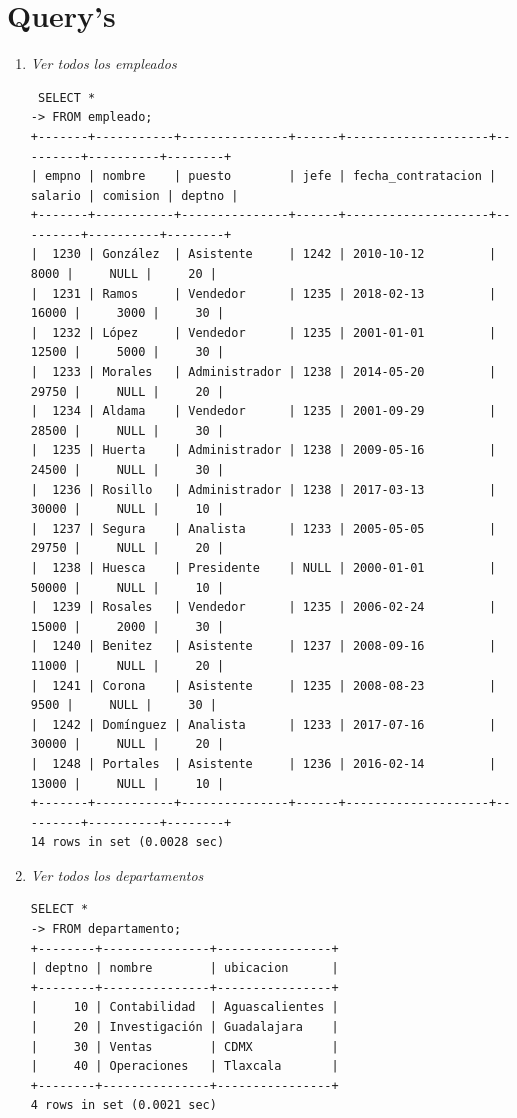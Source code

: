 \documentclass[titlepage,a4paper]{article}
\theoremstyle{definition}
\theoremstyle{remark}
\begin{document}
\section{Query's}
\begin{enumerate}
    \item \textit{Ver todos los empleados}
    \begin{lstlisting}
 SELECT *
-> FROM empleado;
+-------+-----------+---------------+------+--------------------+---------+----------+--------+
| empno | nombre    | puesto        | jefe | fecha_contratacion | salario | comision | deptno |
+-------+-----------+---------------+------+--------------------+---------+----------+--------+
|  1230 | González  | Asistente     | 1242 | 2010-10-12         |    8000 |     NULL |     20 |
|  1231 | Ramos     | Vendedor      | 1235 | 2018-02-13         |   16000 |     3000 |     30 |
|  1232 | López     | Vendedor      | 1235 | 2001-01-01         |   12500 |     5000 |     30 |
|  1233 | Morales   | Administrador | 1238 | 2014-05-20         |   29750 |     NULL |     20 |
|  1234 | Aldama    | Vendedor      | 1235 | 2001-09-29         |   28500 |     NULL |     30 |
|  1235 | Huerta    | Administrador | 1238 | 2009-05-16         |   24500 |     NULL |     30 |
|  1236 | Rosillo   | Administrador | 1238 | 2017-03-13         |   30000 |     NULL |     10 |
|  1237 | Segura    | Analista      | 1233 | 2005-05-05         |   29750 |     NULL |     20 |
|  1238 | Huesca    | Presidente    | NULL | 2000-01-01         |   50000 |     NULL |     10 |
|  1239 | Rosales   | Vendedor      | 1235 | 2006-02-24         |   15000 |     2000 |     30 |
|  1240 | Benitez   | Asistente     | 1237 | 2008-09-16         |   11000 |     NULL |     20 |
|  1241 | Corona    | Asistente     | 1235 | 2008-08-23         |    9500 |     NULL |     30 |
|  1242 | Domínguez | Analista      | 1233 | 2017-07-16         |   30000 |     NULL |     20 |
|  1248 | Portales  | Asistente     | 1236 | 2016-02-14         |   13000 |     NULL |     10 |
+-------+-----------+---------------+------+--------------------+---------+----------+--------+
14 rows in set (0.0028 sec)
    \end{lstlisting}


    \item \textit{Ver todos los departamentos}
    \begin{lstlisting}
SELECT *
-> FROM departamento;
+--------+---------------+----------------+
| deptno | nombre        | ubicacion      |
+--------+---------------+----------------+
|     10 | Contabilidad  | Aguascalientes |
|     20 | Investigación | Guadalajara    |
|     30 | Ventas        | CDMX           |
|     40 | Operaciones   | Tlaxcala       |
+--------+---------------+----------------+
4 rows in set (0.0021 sec)
    \end{lstlisting}



\end{enumerate}
\end{document}
